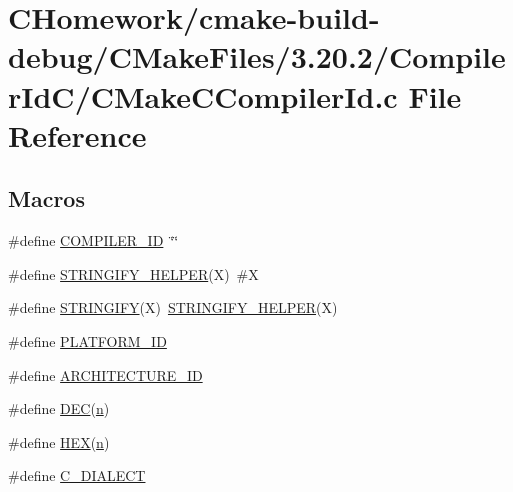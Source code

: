 \hypertarget{_c_homework_2cmake-build-debug_2_c_make_files_23_820_82_2_compiler_id_c_2_c_make_c_compiler_id_8c}{}\section{C\+Homework/cmake-\/build-\/debug/\+C\+Make\+Files/3.20.2/\+Compiler\+Id\+C/\+C\+Make\+C\+Compiler\+Id.c File Reference}
\label{_c_homework_2cmake-build-debug_2_c_make_files_23_820_82_2_compiler_id_c_2_c_make_c_compiler_id_8c}
\subsection*{Macros}
\begin{DoxyCompactItemize}
\item 
\#define \hyperlink{_c_homework_2cmake-build-debug_2_c_make_files_23_820_82_2_compiler_id_c_2_c_make_c_compiler_id_8c_a81dee0709ded976b2e0319239f72d174}{C\+O\+M\+P\+I\+L\+E\+R\+\_\+\+I\+D}~\char`\"{}\char`\"{}
\item 
\#define \hyperlink{_c_homework_2cmake-build-debug_2_c_make_files_23_820_82_2_compiler_id_c_2_c_make_c_compiler_id_8c_a2ae9b72bb13abaabfcf2ee0ba7d3fa1d}{S\+T\+R\+I\+N\+G\+I\+F\+Y\+\_\+\+H\+E\+L\+P\+E\+R}(X)~\#X
\item 
\#define \hyperlink{_c_homework_2cmake-build-debug_2_c_make_files_23_820_82_2_compiler_id_c_2_c_make_c_compiler_id_8c_a43e1cad902b6477bec893cb6430bd6c8}{S\+T\+R\+I\+N\+G\+I\+F\+Y}(X)~\hyperlink{cmake-build-debug_2_c_make_files_23_820_82_2_compiler_id_c_2_c_make_c_compiler_id_8c_a2ae9b72bb13abaabfcf2ee0ba7d3fa1d}{S\+T\+R\+I\+N\+G\+I\+F\+Y\+\_\+\+H\+E\+L\+P\+E\+R}(X)
\item 
\#define \hyperlink{_c_homework_2cmake-build-debug_2_c_make_files_23_820_82_2_compiler_id_c_2_c_make_c_compiler_id_8c_adbc5372f40838899018fadbc89bd588b}{P\+L\+A\+T\+F\+O\+R\+M\+\_\+\+I\+D}
\item 
\#define \hyperlink{_c_homework_2cmake-build-debug_2_c_make_files_23_820_82_2_compiler_id_c_2_c_make_c_compiler_id_8c_aba35d0d200deaeb06aee95ca297acb28}{A\+R\+C\+H\+I\+T\+E\+C\+T\+U\+R\+E\+\_\+\+I\+D}
\item 
\#define \hyperlink{_c_homework_2cmake-build-debug_2_c_make_files_23_820_82_2_compiler_id_c_2_c_make_c_compiler_id_8c_ad1280362da42492bbc11aa78cbf776ad}{D\+E\+C}(\hyperlink{lesson3_8c_acfc02ec89670db29251fda6a66602ce2}{n})
\item 
\#define \hyperlink{_c_homework_2cmake-build-debug_2_c_make_files_23_820_82_2_compiler_id_c_2_c_make_c_compiler_id_8c_a46d5d95daa1bef867bd0179594310ed5}{H\+E\+X}(\hyperlink{lesson3_8c_acfc02ec89670db29251fda6a66602ce2}{n})
\item 
\#define \hyperlink{_c_homework_2cmake-build-debug_2_c_make_files_23_820_82_2_compiler_id_c_2_c_make_c_compiler_id_8c_a07f8e5783674099cd7f5110e22a78cdb}{C\+\_\+\+D\+I\+A\+L\+E\+C\+T}
\end{DoxyCompactItemize}
